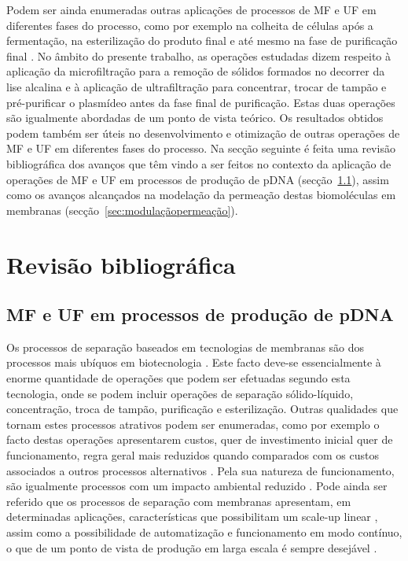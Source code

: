 Podem ser ainda enumeradas outras aplicações de processos de MF e UF em diferentes fases do processo, como por exemplo na colheita de células após a fermentação, na esterilização do produto final e até mesmo na fase de purificação final \cite{zydneyiso}. No âmbito do presente trabalho, as operações estudadas dizem respeito à aplicação da microfiltração para a remoção de sólidos formados no decorrer da lise alcalina e à aplicação de ultrafiltração para concentrar, trocar de tampão e pré-purificar o plasmídeo antes da fase final de purificação.
Estas duas operações são igualmente abordadas de um ponto de vista teórico. Os resultados obtidos podem também ser úteis no desenvolvimento e otimização de outras operações de MF e UF em diferentes fases do processo. Na secção seguinte é feita uma revisão bibliográfica dos avanços que têm vindo a ser feitos no contexto da aplicação de operações de MF e UF em processos de produção de pDNA (secção~\ref{sub:processosrevisão}), assim como os avanços alcançados na modelação da permeação destas biomoléculas em membranas (secção~\ref{sec:modulaçãopermeação}).

\section{Revisão bibliográfica}
\label{sec:membranasnaprodução}

\subsection{MF e UF em processos de produção de pDNA}
\label{sub:processosrevisão}
Os processos de separação baseados em tecnologias de membranas são dos processos mais ubíquos em biotecnologia \cite{rathore}. Este facto deve-se essencialmente à enorme quantidade de operações que podem ser efetuadas segundo esta tecnologia, onde se podem incluir operações de separação sólido-líquido, concentração, troca de tampão, purificação e esterilização. Outras qualidades que tornam estes processos atrativos podem ser enumeradas, como por exemplo o facto destas operações apresentarem custos, quer de investimento inicial quer de funcionamento, regra geral mais reduzidos quando comparados com os custos associados a outros processos alternativos \cite{rathore}. Pela sua natureza de funcionamento, são igualmente processos com um impacto ambiental reduzido \cite{freitas}. Pode ainda ser referido que os processos de separação com membranas apresentam, em determinadas aplicações, características que possibilitam um scale-up linear \cite{reis}, assim como a possibilidade de automatização e funcionamento em modo contínuo, o que de um ponto de vista de produção em larga escala é sempre desejável \cite{plumb}. 

